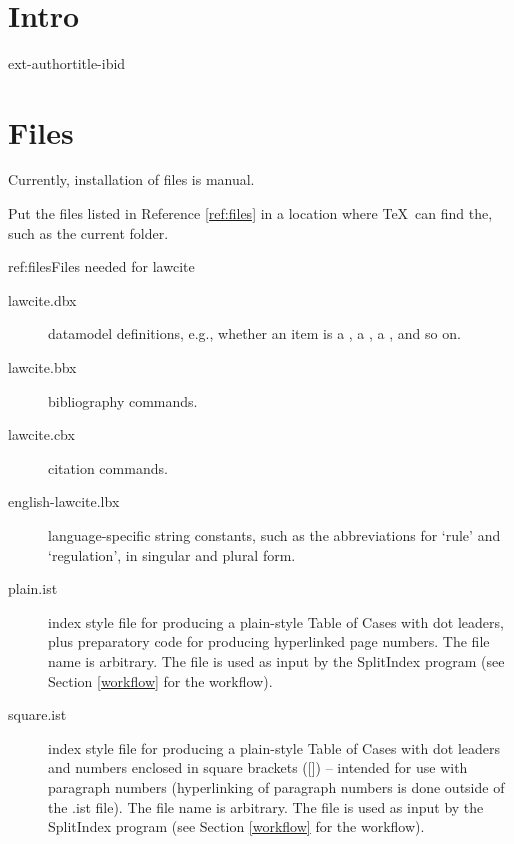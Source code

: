 \let\xoldtwocolumn\twocolumn
\iftoggle{printlegtoc}{%
\let\oldtwocolumn\twocolumn
\renewcommand{\twocolumn}[1][]{#1}
\let\oldclearpage\clearpage
\renewcommand\clearpage{\relax}
\extendtheindex{}{\useindexpreamble}{}{}
\printindex[cases]
\printindex[legislation]
\iftoggle{printregulations}{\printindex[regulations]}{}
\renewcommand{\twocolumn}[1][]{\oldtwocolumn}
\renewcommand\clearpage{\oldclearpage}
}{}
\bigskip
\hfill{}\hfill\ %
\bigskip




\section{Intro}
ext-authortitle-ibid

\section{Files}
Currently, installation of files is manual.

Put the files listed in Reference \ref{ref:files} in a location where \TeX\ can find the, such as the current folder.

\begin{dor}{ref:files}{Files needed for lawcite}
\begin{description}
\item[lawcite.dbx]  datamodel definitions, e.g., whether an item is a , a , a , and so on.
\item[lawcite.bbx]  bibliography commands.
\item[lawcite.cbx]  citation commands.
\item[english-lawcite.lbx]  language-specific string constants, such as the abbreviations for `rule' and `regulation', in singular and plural form.
\item[plain.ist] index style file for producing a plain-style Table of Cases with dot leaders, plus preparatory code for producing hyperlinked page numbers. The file name is arbitrary. The file is used as input by the SplitIndex program (see Section \ref{workflow} for the workflow). 
\item[square.ist] index style file for producing a plain-style Table of Cases with dot leaders and numbers enclosed in square brackets ([]) -- intended for use with paragraph numbers (hyperlinking of paragraph numbers is done outside of the .ist file). The file name is arbitrary. The file is used as input by the SplitIndex program (see Section \ref{workflow} for the workflow).
\end{description}
\end{dor}

